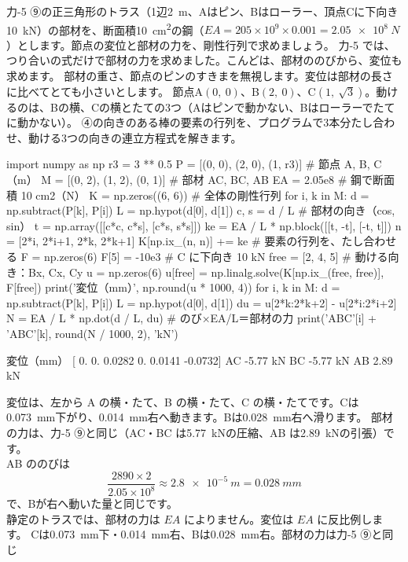\begin{phreidai}\label{ph:力-16:ex3}
力-5 ⑨の正三角形のトラス（1辺\qty{2}{m}、Aはピン、Bはローラー、頂点Cに下向き\qty{10}{kN}）の部材を、断面積\qty{10}{cm^2}の鋼（$EA=205\times10^9\times0.001=\qty{2.05e8}{N}$）とします。節点の変位と部材の力を、剛性行列で求めましょう。
\phbamen
力-5 では、つり合いの式だけで部材の力を求めました。こんどは、部材ののびから、変位も求めます。
\phmushi
部材の重さ、節点のピンのすきまを無視します。変位は部材の長さに比べてとても小さいとします。
\phzu
節点A$(0,\ 0)$、B$(2,\ 0)$、C$(1,\ \sqrt3)$。動けるのは、Bの横、Cの横とたての3つ（Aはピンで動かない、Bはローラーでたてに動かない）。
\phriyu
④の向きのある棒の要素の行列を、プログラムで3本分たし合わせ、動ける3つの向きの連立方程式を解きます。
\phtateru
\begin{phcode}
import numpy as np
r3 = 3 ** 0.5
P = [(0, 0), (2, 0), (1, r3)]       \# 節点 A, B, C（m）
M = [(0, 2), (1, 2), (0, 1)]        \# 部材 AC, BC, AB
EA = 2.05e8                         \# 鋼で断面積 10 cm2（N）
K = np.zeros((6, 6))                \# 全体の剛性行列
for i, k in M:
    d = np.subtract(P[k], P[i])
    L = np.hypot(d[0], d[1])
    c, s = d / L                    \# 部材の向き（cos, sin）
    t = np.array([[c*c, c*s], [c*s, s*s]])
    ke = EA / L * np.block([[t, -t], [-t, t]])
    n = [2*i, 2*i+1, 2*k, 2*k+1]
    K[np.ix\_(n, n)] += ke           \# 要素の行列を、たし合わせる
F = np.zeros(6)
F[5] = -10e3                        \# C に下向き 10 kN
free = [2, 4, 5]                    \# 動ける向き：Bx, Cx, Cy
u = np.zeros(6)
u[free] = np.linalg.solve(K[np.ix\_(free, free)], F[free])
print('変位（mm）', np.round(u * 1000, 4))
for i, k in M:
    d = np.subtract(P[k], P[i])
    L = np.hypot(d[0], d[1])
    du = u[2*k:2*k+2] - u[2*i:2*i+2]
    N = EA / L * np.dot(d / L, du)  \# のび×EA/L＝部材の力
    print('ABC'[i] + 'ABC'[k], round(N / 1000, 2), 'kN')
\end{phcode}
\phtoku
\begin{phcodeout}
変位（mm） [ 0.      0.      0.0282  0.      0.0141 -0.0732]
AC -5.77 kN
BC -5.77 kN
AB 2.89 kN
\end{phcodeout}
変位は、左から A の横・たて、B の横・たて、C の横・たてです。Cは\qty{0.073}{mm}下がり、\qty{0.014}{mm}右へ動きます。Bは\qty{0.028}{mm}右へ滑ります。
\phtashikame
部材の力は、力-5 ⑨と同じ（AC・BC は\qty{5.77}{kN}の圧縮、AB は\qty{2.89}{kN}の引張）です。\\
AB ののびは
\[\frac{2890\times2}{2.05\times10^8}\approx\qty{2.8e-5}{m}=\qty{0.028}{mm}\]
で、Bが右へ動いた量と同じです。\\
静定のトラスでは、部材の力は $EA$ によりません。変位は $EA$ に反比例します。
\kotae Cは\qty{0.073}{mm}下・\qty{0.014}{mm}右、Bは\qty{0.028}{mm}右。部材の力は力-5 ⑨と同じ
\end{phreidai}


